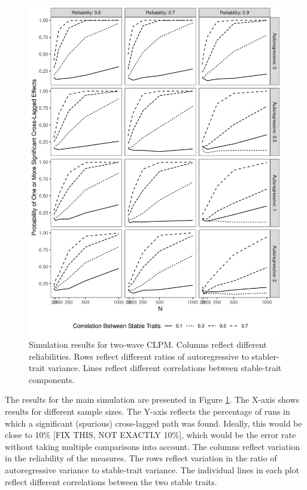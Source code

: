 \documentclass[
  english,
  man,floatsintext]{apa6}
\begin{document}
\begin{figure}
\includegraphics[width=6.5in,height=0.9\textheight]{images/2WaveSimulation} \caption{Simulation results for two-wave CLPM. Columns reflect different reliabilities. Rows reflect different ratios of autoregressive to stabler-trait variance. Lines reflect different correlations between stable-trait components.}\label{fig:simFig}
\end{figure}

The results for the main simulation are presented in Figure \ref{fig:simFig}. The X-axis shows results for different sample sizes. The Y-axis reflects the percentage of runs in which a significant (spurious) cross-lagged path was found. Ideally, this would be close to 10\% {[}FIX THIS, NOT EXACTLY 10\%{]}, which would be the error rate without taking multiple comparisons into account. The columns reflect variation in the reliability of the measures. The rows reflect variation in the ratio of autoregressive variance to stable-trait variance. The individual lines in each plot reflect different correlations between the two stable traits.
\end{document}
